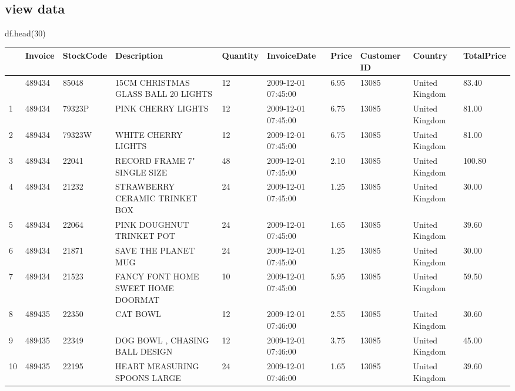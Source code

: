 \documentclass[
]{ctexart}
\newenvironment{Shaded}{\begin{snugshade}}{\end{snugshade}}
\newcommand{\DecValTok}[1]{\textcolor[rgb]{0.68,0.00,0.00}{#1}}
\newcommand{\NormalTok}[1]{\textcolor[rgb]{0.00,0.23,0.31}{#1}}
\newcounter{none} %
\begin{document}
\subsection{view data}\label{view-data}

\begin{Shaded}
\begin{Highlighting}[]
\NormalTok{df.head(}\DecValTok{30}\NormalTok{)}
\end{Highlighting}
\end{Shaded}

{\def\LTcaptype{none} %
\begin{longtable}[]{@{}llllllllll@{}}
\toprule\noalign{}
& Invoice & StockCode & Description & Quantity & InvoiceDate & Price &
Customer ID & Country & TotalPrice \\
\midrule\noalign{}
\endhead
\bottomrule\noalign{}
\endlastfoot
0 & 489434 & 85048 & 15CM CHRISTMAS GLASS BALL 20 LIGHTS & 12 &
2009-12-01 07:45:00 & 6.95 & 13085 & United Kingdom & 83.40 \\
1 & 489434 & 79323P & PINK CHERRY LIGHTS & 12 & 2009-12-01 07:45:00 &
6.75 & 13085 & United Kingdom & 81.00 \\
2 & 489434 & 79323W & WHITE CHERRY LIGHTS & 12 & 2009-12-01 07:45:00 &
6.75 & 13085 & United Kingdom & 81.00 \\
3 & 489434 & 22041 & RECORD FRAME 7" SINGLE SIZE & 48 & 2009-12-01
07:45:00 & 2.10 & 13085 & United Kingdom & 100.80 \\
4 & 489434 & 21232 & STRAWBERRY CERAMIC TRINKET BOX & 24 & 2009-12-01
07:45:00 & 1.25 & 13085 & United Kingdom & 30.00 \\
5 & 489434 & 22064 & PINK DOUGHNUT TRINKET POT & 24 & 2009-12-01
07:45:00 & 1.65 & 13085 & United Kingdom & 39.60 \\
6 & 489434 & 21871 & SAVE THE PLANET MUG & 24 & 2009-12-01 07:45:00 &
1.25 & 13085 & United Kingdom & 30.00 \\
7 & 489434 & 21523 & FANCY FONT HOME SWEET HOME DOORMAT & 10 &
2009-12-01 07:45:00 & 5.95 & 13085 & United Kingdom & 59.50 \\
8 & 489435 & 22350 & CAT BOWL & 12 & 2009-12-01 07:46:00 & 2.55 & 13085
& United Kingdom & 30.60 \\
9 & 489435 & 22349 & DOG BOWL , CHASING BALL DESIGN & 12 & 2009-12-01
07:46:00 & 3.75 & 13085 & United Kingdom & 45.00 \\
10 & 489435 & 22195 & HEART MEASURING SPOONS LARGE & 24 & 2009-12-01
07:46:00 & 1.65 & 13085 & United Kingdom & 39.60 \\

\end{longtable}}
\end{document}
